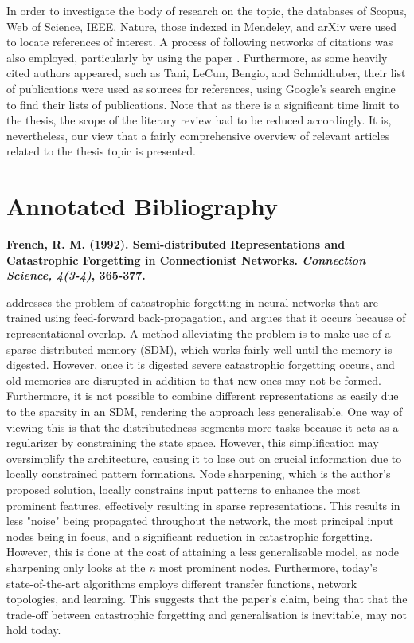 In order to investigate the body of research on the topic, the databases of Scopus, Web of Science, IEEE, Nature, those indexed in Mendeley, and arXiv were used to locate references of interest. A process of following networks of citations was also employed, particularly by using the paper \cite{McClelland1995}. Furthermore, as some heavily cited authors appeared, such as Tani, LeCun, Bengio, and Schmidhuber, their list of publications were used as sources for references, using Google's search engine to find their lists of publications. Note that as there is a significant time limit to the thesis, the scope of the literary review had to be reduced accordingly. It is, nevertheless, our view that a fairly comprehensive overview of relevant articles related to the thesis topic is presented.

\section{Annotated Bibliography}

\textbf{French, R. M. (1992). Semi-distributed Representations and Catastrophic Forgetting in Connectionist Networks.\textit{ Connection Science, 4(3-4)}, 365-377.}

\cite{French1992} addresses the problem of catastrophic forgetting \cite{McCloskey1989, Ratcliff1990} in neural networks that are trained using feed-forward back-propagation, and argues that it occurs because of representational overlap. A method alleviating the problem is to make use of a sparse distributed memory (SDM), which works fairly well until the memory is digested. However, once it is digested severe catastrophic forgetting occurs, and old memories are disrupted in addition to that new ones may not be formed. Furthermore, it is not possible to combine different representations as easily due to the sparsity in an SDM, rendering the approach less generalisable. One way of viewing this is that the distributedness segments more tasks because it acts as a regularizer by constraining the state space. However, this simplification may oversimplify the architecture, causing it to lose out on crucial information due to locally constrained pattern formations. Node sharpening, which is the author's proposed solution, locally constrains input patterns to enhance the most prominent features, effectively resulting in sparse representations. This results in less "noise" being propagated throughout the network, the most principal input nodes being in focus, and a significant reduction in catastrophic forgetting. However, this is done at the cost of attaining a less generalisable model, as node sharpening only looks at the \textit{n} most prominent nodes. Furthermore, today's state-of-the-art algorithms employs different transfer functions, network topologies, and learning. This suggests that the paper's claim, being that that the trade-off between catastrophic forgetting and generalisation is inevitable, may not hold today.


